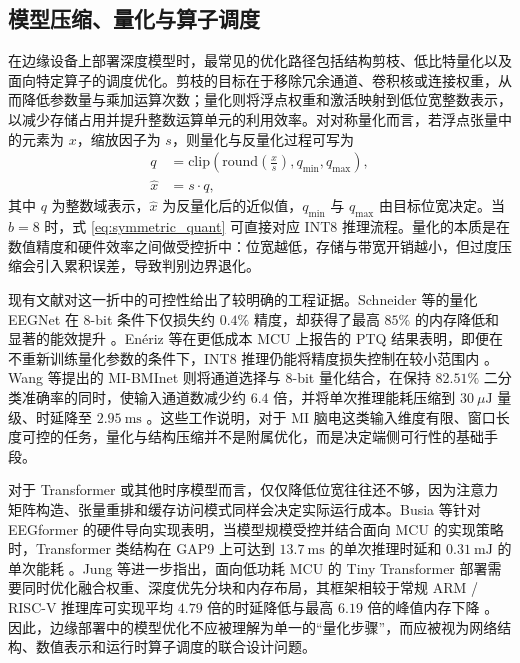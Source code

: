 \subsection{模型压缩、量化与算子调度}

在边缘设备上部署深度模型时，最常见的优化路径包括结构剪枝、低比特量化以及面向特定算子的调度优化。剪枝的目标在于移除冗余通道、卷积核或连接权重，从而降低参数量与乘加运算次数；量化则将浮点权重和激活映射到低位宽整数表示，以减少存储占用并提升整数运算单元的利用效率。对对称量化而言，若浮点张量中的元素为 $x$，缩放因子为 $s$，则量化与反量化过程可写为
\begin{equation}
\begin{aligned}
q &= \mathrm{clip}\!\left(\mathrm{round}\!\left(\frac{x}{s}\right), q_{\min}, q_{\max}\right), \\
\hat{x} &= s \cdot q,
\end{aligned}
\label{eq:symmetric_quant}
\end{equation}
其中 $q$ 为整数域表示，$\hat{x}$ 为反量化后的近似值，$q_{\min}$ 与 $q_{\max}$ 由目标位宽决定。当 $b=8$ 时，式 \eqref{eq:symmetric_quant} 可直接对应 INT8 推理流程。量化的本质是在数值精度和硬件效率之间做受控折中：位宽越低，存储与带宽开销越小，但过度压缩会引入累积误差，导致判别边界退化。

现有文献对这一折中的可控性给出了较明确的工程证据。Schneider 等的量化 EEGNet 在 8-bit 条件下仅损失约 $0.4\%$ 精度，却获得了最高 $85\%$ 的内存降低和显著的能效提升 \cite{Sch20}。En\'eriz 等在更低成本 MCU 上报告的 PTQ 结果表明，即便在不重新训练量化参数的条件下，INT8 推理仍能将精度损失控制在较小范围内 \cite{Ene23}。Wang 等提出的 MI-BMInet 则将通道选择与 8-bit 量化结合，在保持 $82.51\%$ 二分类准确率的同时，使输入通道数减少约 $6.4$ 倍，并将单次推理能耗压缩到 $30\ \mu\text{J}$ 量级、时延降至 $2.95\ \text{ms}$ \cite{Wan22b}。这些工作说明，对于 MI 脑电这类输入维度有限、窗口长度可控的任务，量化与结构压缩并不是附属优化，而是决定端侧可行性的基础手段。

对于 Transformer 或其他时序模型而言，仅仅降低位宽往往还不够，因为注意力矩阵构造、张量重排和缓存访问模式同样会决定实际运行成本。Busia 等针对 EEGformer 的硬件导向实现表明，当模型规模受控并结合面向 MCU 的实现策略时，Transformer 类结构在 GAP9 上可达到 $13.7\ \text{ms}$ 的单次推理时延和 $0.31\ \text{mJ}$ 的单次能耗 \cite{bus2024reducing}。Jung 等进一步指出，面向低功耗 MCU 的 Tiny Transformer 部署需要同时优化融合权重、深度优先分块和内存布局，其框架相较于常规 ARM / RISC-V 推理库可实现平均 $4.79$ 倍的时延降低与最高 $6.19$ 倍的峰值内存下降 \cite{Jun24}。因此，边缘部署中的模型优化不应被理解为单一的“量化步骤”，而应被视为网络结构、数值表示和运行时算子调度的联合设计问题。

